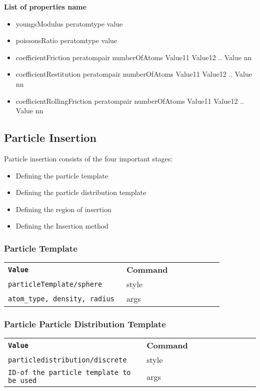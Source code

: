 \documentclass[8pt]{extarticle} %
\begin{document}
\begin{multicols}{3}
  \textbf{List of properties name}
  \begin{itemize}
  \item youngsModulus peratomtype value
  \item poissonsRatio peratomtype value
  \item coefficientFriction peratompair numberOfAtoms Value11 Value12 .. Value nn
  \item coefficientRestitution peratompair numberOfAtoms Value11 Value12 .. Value nn
  \item coefficientRollingFriction peratompair numberOfAtoms Value11 Value12 .. Value nn
  \end{itemize}

  \subsection{Particle Insertion}
  Particle insertion consists of the four important stages:
  \begin{itemize}
  \item Defining the particle template
  \item Defining the particle distribution template
  \item Defining the region of insertion
  \item Defining the Insertion method
  \end{itemize}

\subsubsection{Particle Template}
\begin{tabular}{L{0.55\linewidth} L{0.45\linewidth}}
  \tt \textbf{Value} & \textbf{Command} \\
  \tt  particleTemplate/sphere  & style \\
  \tt  atom\_type, density, radius & args \\
\end{tabular}
  \vspace*{2ex}


\subsubsection{Particle Particle Distribution Template}
\begin{tabular}{L{0.55\linewidth} L{0.45\linewidth}}
  \tt \textbf{Value}  &  \textbf{Command} \\
  \tt particledistribution/discrete & style \\
  \tt ID-of the particle template to be used & args \\
\end{tabular}


\end{multicols}
\end{document}
